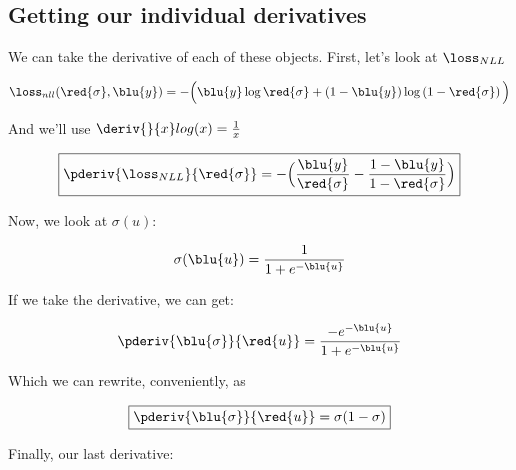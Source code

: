     \subsection*{Getting our individual derivatives}
    
        We can take the derivative of each of these objects. First, let's look at $\loss_{NLL}$
        
        \begin{equation*}
            \loss_{nll}
            (\red{\sigma}, \blu{y})
            =
            -
            \Big(
                \blu{y} \log{ \red{\sigma} }
                +
                \left( 1 - \blu{y} \right)
                \log
                \left( 1 - \red{\sigma} \right) 
            \Big)
        \end{equation*}
        
        And we'll use $\deriv{}{x} log(x) = \frac{1}{x}$
        
        \begin{equation}
        \boxed{
            \pderiv{ \loss_{NLL} }{\red{\sigma}} =
            -
            \Big(
                \frac{ \blu{y} } { \red{\sigma} } 
                -
                \frac{ 1-\blu{y} } { 1 - \red{\sigma} }
            \Big)
        }
        \end{equation}
        
        Now, we look at $\sigma(u)$:
        
        \begin{equation}
            \sigma(\blu{u}) = \frac{1}{1+e^{-\blu{u} }}
        \end{equation}
        
        If we take the derivative, we can get:
        
        \begin{equation}
            \pderiv{ \blu{\sigma} }{\red{u}}
            =
            \frac{ -e^{ -\blu{u} } }{ 1+e^{ -\blu{u} } }
        \end{equation}
        
        Which we can rewrite, conveniently, as
        
        \begin{equation}
        \boxed{
            \pderiv{ \blu{\sigma} }{\red{u}}
            =
            \sigma (1-\sigma)
        }
        \end{equation}
        
        Finally, our last derivative:
        
